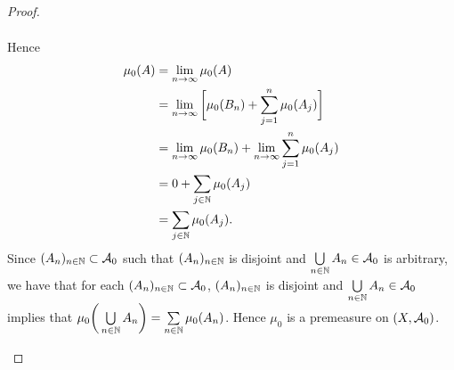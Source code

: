 \documentclass{book}
\begin{document}
\begin{proof}
\begin{enumerate}
\begin{align*}
			\end{align*}
			Hence 
			\begin{align*}
				\mu_0(A)
				& = \lim_{n \rightarrow \infty} \mu_0(A) \\
				& = \lim_{n \rightarrow \infty} \bigg[ \mu_0(B_n) + \sum\limits_{j=1}^n \mu_0(A_j) \bigg] \\
				& = \lim_{n \rightarrow \infty} \mu_0(B_n) + \lim_{n \rightarrow \infty} \sum\limits_{j=1}^n \mu_0(A_j) \\
				& = 0 + \sum\limits_{j \in \mathbb{N}} \mu_0(A_j) \\
				& = \sum\limits_{j \in \mathbb{N}} \mu_0(A_j).
			\end{align*}  
			Since $(A_n)_{n \in \mathbb{N}} \subset \mathcal{A}_0$ such that $(A_n)_{n \in \mathbb{N}}$ is disjoint and $\bigcup\limits_{n \in \mathbb{N}} A_n \in \mathcal{A}_0$ is arbitrary, we have that for each $(A_n)_{n \in \mathbb{N}} \subset \mathcal{A}_0$, $(A_n)_{n \in \mathbb{N}}$ is disjoint and $\bigcup\limits_{n \in \mathbb{N}} A_n \in \mathcal{A}_0$ implies that $\mu_0 \bigg(\bigcup\limits_{n\in \mathbb{N}}A_n \bigg) = \sum\limits_{n \in \mathbb{N}}\mu_0(A_n)$. Hence $\mu_0$ is a premeasure on $(X, \mathcal{A}_0)$.
		\end{enumerate}
	\end{proof}
\end{document}

